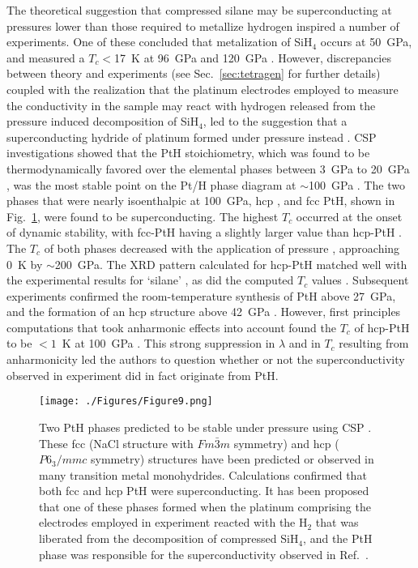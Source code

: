 \documentclass[12pt,letterpaper,oneside]{article}
\begin{document}
The theoretical suggestion that compressed silane may be superconducting at pressures lower than those required to metallize hydrogen \cite{Ashcroft:2004a,Feng:2006a,Pickard:2006a} inspired a number of experiments. One of these concluded that metalization of SiH$_4$ occurs at 50~GPa, and measured a  $T_c<$17~K at 96~GPa and 120~GPa  \cite{Eremets:2008a}. However, discrepancies between theory and experiments (see Sec.\ \ref{sec:tetragen} for further details) coupled with the realization that the platinum electrodes employed to measure the conductivity in the sample may react with hydrogen released from the pressure induced decomposition of SiH$_4$, led to the suggestion that a superconducting hydride of platinum formed under pressure instead \cite{Degtyareva:2009a}. CSP investigations showed that the PtH stoichiometry, which was found to be thermodynamically favored over the elemental phases between 3~GPa \cite{Gao:2012} to 20~GPa \cite{Kim:2011a}, was the most stable point on the Pt/H phase diagram at $\sim$100~GPa \cite{Zhou:2011a}. The two phases that were nearly isoenthalpic at 100~GPa, hcp \cite{Zhou:2011a,Kim:2011a}, and fcc \cite{Kim:2011a} PtH, shown in Fig.\ \ref{fig:pth}, were found to be superconducting. The highest $T_c$ occurred at the onset of dynamic stability, with  fcc-PtH having a slightly larger value than hcp-PtH \cite{Kim:2011a}. The $T_c$ of both phases decreased with the application of pressure \cite{Kim:2011a,Zhou:2011a,Zhang:2011}, approaching 0~K by $\sim$200~GPa. The XRD pattern calculated for hcp-PtH matched well with the experimental results for `silane' \cite{Zhou:2011a}, as did the computed $T_c$ values \cite{Kim:2011a,Zhou:2011a,Scheler:2011a}. Subsequent experiments confirmed the room-temperature synthesis of PtH above 27~GPa, and the formation of an hcp structure above 42~GPa \cite{Scheler:2011a}. However, first principles computations that took anharmonic effects into account found the $T_c$ of hcp-PtH to be $<1$~K at 100~GPa \cite{Errea:2014}. This strong suppression in $\lambda$ and in $T_c$ resulting from anharmonicity led the authors to question whether or not the superconductivity observed in experiment did in fact originate from PtH. 

\begin{figure}[ht!]
\begin{center}
\texttt{[image: ./Figures/Figure9.png]}
\end{center}
\caption{Two PtH phases predicted to be stable under pressure using CSP \cite{Zhou:2011a,Kim:2011a,Scheler:2011a}. These fcc (NaCl structure with $Fm\bar{3}m$ symmetry) and hcp ($P6_3/mmc$ symmetry) structures have been predicted or observed in many transition metal monohydrides. Calculations confirmed that both fcc and hcp PtH were superconducting. It has been proposed that one of these phases formed when the platinum comprising the electrodes employed in experiment reacted with the H$_2$ that was liberated from the decomposition of compressed SiH$_4$, and the PtH phase was responsible for the superconductivity observed in Ref.\ \cite{Eremets:2008a}.}
\label{fig:pth}
\end{figure}
\end{document}
